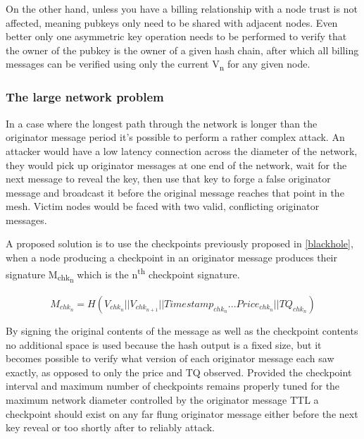 \documentclass[11pt]{article}
\begin{document}
                      On the other hand, unless you have a billing relationship with a node trust is not affected, meaning pubkeys only need to be shared with adjacent nodes. Even better only one asymmetric key operation needs to be performed to verify that the owner of the pubkey is the owner of a given hash chain, after which all billing messages can be verified using only the current V\textsubscript{n} for any given node.
               
               \subsubsection{The large network problem}
                        
                        In a case where the longest path through the network is longer than the originator message period it's possible to perform a rather complex attack. An attacker would have a low latency connection across the diameter of the network, they would pick up originator messages at one end of the network, wait for the next message to reveal the key, then use that key to forge a false originator message and broadcast it before the original message reaches that point in the mesh. Victim nodes would be faced with two valid, conflicting originator messages.
                        
                        A proposed solution is to use the checkpoints previously proposed in \ref{blackhole}, when a node producing a checkpoint in an originator message produces their signature M\textsubscript{chk\textsubscript{n}} which is the n\textsuperscript{th} checkpoint signature.
                        
                        \[M_{chk_n} = H(V_{chk_n}||V_{chk_{n+1}}||Timestamp_{chk_n}...Price_{chk_n}||TQ_{chk_n})\]
                        
                        By signing the original contents of the message as well as the checkpoint contents no additional space is used because the hash output is a fixed size, but it becomes possible to verify what version of each originator message each saw exactly, as opposed to only the price and TQ observed. Provided the checkpoint interval and maximum number of checkpoints remains properly tuned for the maximum network diameter controlled by the originator message TTL a checkpoint should exist on any far flung originator message either before the next key reveal or too shortly after to reliably attack.
                                                
\end{document}

